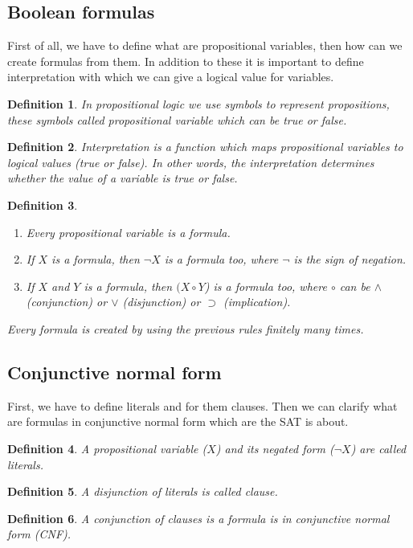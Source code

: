 \documentclass{article}
\newtheorem{definition}{Definition}
\begin{document}
\subsection{Boolean formulas}
First of all, we have to define what are propositional variables, then how can we create formulas from them. In addition to these it is important to define interpretation with which we can give a logical value for variables.
\begin{definition}
In propositional logic we use symbols to represent propositions, these symbols called propositional variable which can be true or false.
\end{definition}
\begin{definition}
Interpretation is a function which maps propositional variables to logical values (true or false). In other words, the interpretation determines whether the value of a variable is true or false.
\end{definition}
\begin{definition}
\begin{enumerate}
    \item Every propositional variable is a formula.
    \item If $X$ is a formula, then $\neg X$ is a formula too, where $\neg $ is the sign of negation.
    \item If $X$ and $Y$ is a formula, then $(X \circ Y$) is a formula too, where $\circ$ can be $\wedge$ (conjunction) or $\vee$ (disjunction) or $\supset$ (implication).
\end{enumerate}
Every formula is created by using the previous rules finitely many times.
\end{definition}

\subsection{Conjunctive normal form}
First, we have to define literals and for them clauses. Then we can clarify what are formulas in conjunctive normal form which are the SAT is about.
\begin{definition}
A propositional variable ($X$) and its negated form ($\neg X$) are called literals.
\end{definition}
\begin{definition}
A disjunction of literals is called clause.
\end{definition}
\begin{definition}
A conjunction of clauses is a formula is in conjunctive normal form (CNF).
\end{definition}
\end{document}
